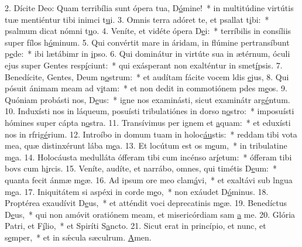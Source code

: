 2. Dícite Deo: Quam terribília sunt ópera tua, D\uline{ó}mine!~* in multitúdine virtútis tuæ mentiéntur tibi inimci t\uline{u}i.
3. Omnis terra adóret te, et psallat t\uline{i}bi:~* psalmum dicat nómni t\uline{u}o.
4. Veníte, et vidéte ópera D\uline{e}i:~* terríbilis in consíliis super fílos h\uline{ó}minum.
5. Qui convértit mare in áridam, in flúmine pertransíbunt p\uline{e}de:~* ibi lætábimr in \uline{i}pso.
6. Qui dominátur in virtúte sua in ætérnum, óculi ejus super Gentes resp\uline{í}ciunt:~* qui exásperant non exalténtur in smet\uline{í}psis.
7. Benedícite, Gentes, Deum n\uline{o}strum:~* et audítam fácite vocem ldis \uline{e}jus,
8. Qui pósuit ánimam meam ad v\uline{i}tam:~* et non dedit in commotiónem pdes m\uline{e}os.
9. Quóniam probásti nos, D\uline{e}us:~* igne nos examinásti, sicut examinátr arg\uline{é}ntum.
10. Induxísti nos in láqueum, posuísti tribulatiónes in dorso n\uline{o}stro:~* imposuísti hómines super cápta n\uline{o}stra.
11. Transívimus per ignem et \uline{a}quam:~* et eduxísti nos in rfrig\uline{é}rium.
12. Introíbo in domum tuam in holoc\uline{áu}stis:~* reddam tibi vota mea, quæ distinxérunt lába m\uline{e}a.
13. Et locútum est os m\uline{e}um,~* in tribulatine m\uline{e}a.
14. Holocáusta medulláta ófferam tibi cum incénso ar\uline{í}etum:~* ófferam tibi bovs cum h\uline{i}rcis.
15. Veníte, audíte, et narrábo, omnes, qui timétis D\uline{e}um:~* quanta fecit ánmæ m\uline{e}æ.
16. Ad ipsum ore meo clam\uline{á}vi,~* et exaltávi sub lngua m\uline{e}a.
17. Iniquitátem si aspéxi in corde m\uline{e}o,~* non exáudet D\uline{ó}minus.
18. Proptérea exaudívit D\uline{e}us,~* et atténdit voci deprecatinis m\uline{e}æ.
19. Benedíctus D\uline{e}us,~* qui non amóvit oratiónem meam, et misericórdiam sam \uline{a} me.
20. Glória Patri, et F\uline{í}lio,~* et Spiríti S\uline{a}ncto.
21. Sicut erat in princípio, et nunc, et s\uline{e}mper,~* et in sǽcula sæculrum. \uline{A}men.
